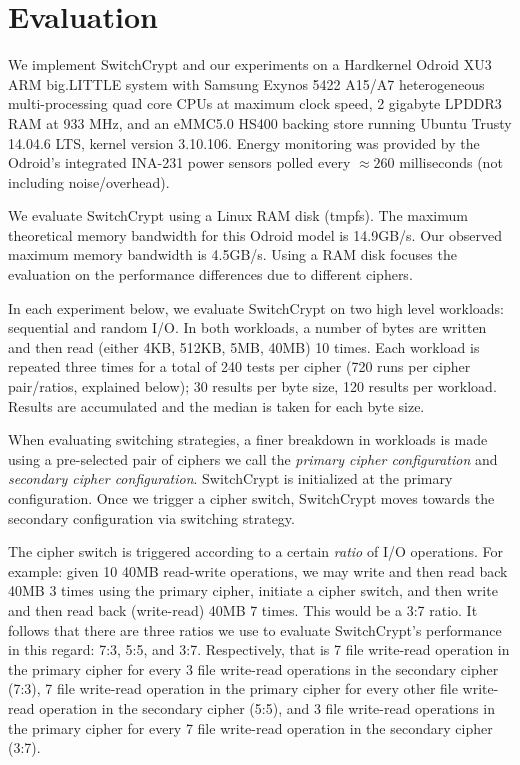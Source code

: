 \section{Evaluation} \label{sec:evaluation}

We implement SwitchCrypt and our experiments on a Hardkernel Odroid XU3 ARM
big.LITTLE system with Samsung Exynos 5422 A15/A7 heterogeneous multi-processing
quad core CPUs at maximum clock speed, 2 gigabyte LPDDR3 RAM at 933 MHz, and an
eMMC5.0 HS400 backing store running Ubuntu Trusty 14.04.6 LTS, kernel version
3.10.106. Energy monitoring was provided by the Odroid's integrated INA-231
power sensors polled every $\approx{260}$ milliseconds (not including
noise/overhead).

We evaluate SwitchCrypt using a Linux RAM disk (tmpfs). The maximum theoretical
memory bandwidth for this Odroid model is 14.9GB/s\@. Our observed maximum
memory bandwidth is 4.5GB/s. Using a RAM disk focuses the evaluation on the
performance differences due to different ciphers.

In each experiment below, we evaluate SwitchCrypt on two high level workloads:
sequential and random I/O. In both workloads, a number of bytes are written and
then read (either 4KB, 512KB, 5MB, 40MB) 10 times. Each workload is repeated
three times for a total of 240 tests per cipher (720 runs per cipher
pair/ratios, explained below); 30 results per byte size, 120 results per
workload. Results are accumulated and the median is taken for each byte size.

When evaluating switching strategies, a finer breakdown in workloads is made
using a pre-selected pair of ciphers we call the \emph{primary cipher
configuration} and \emph{secondary cipher configuration}. SwitchCrypt is
initialized at the primary configuration. Once we trigger a cipher switch,
SwitchCrypt moves towards the secondary configuration via switching strategy.

The cipher switch is triggered according to a certain \emph{ratio} of I/O
operations. For example: given 10 40MB read-write operations, we may write and
then read back 40MB 3 times using the primary cipher, initiate a cipher switch,
and then write and then read back (write-read) 40MB 7 times. This would be a 3:7
ratio. It follows that there are three ratios we use to evaluate SwitchCrypt's
performance in this regard: 7:3, 5:5, and 3:7. Respectively, that is 7 file
write-read operation in the primary cipher for every 3 file write-read
operations in the secondary cipher (7:3), 7 file write-read operation in the
primary cipher for every other file write-read operation in the secondary cipher
(5:5), and 3 file write-read operations in the primary cipher for every 7 file
write-read operation in the secondary cipher (3:7).

